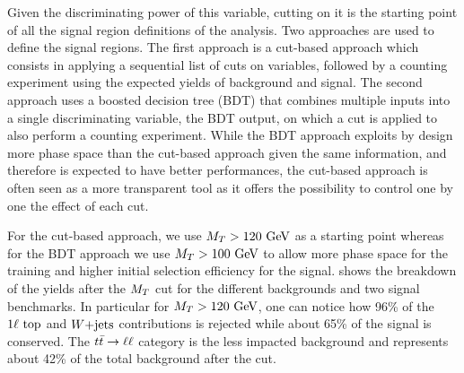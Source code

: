     Given the discriminating power of this variable, cutting on it is the starting point
    of all the signal region definitions of the analysis. Two approaches are used to define
    the signal regions. The first approach is a cut-based approach which consists in applying
    a sequential list of cuts on variables, followed by a counting experiment using the
    expected yields of background and signal. The second approach uses a boosted decision
    tree (BDT) that combines multiple inputs into a single discriminating variable, the
    BDT output, on which a cut is applied to also perform a counting experiment. While the
    BDT approach exploits by design more phase space than the cut-based approach given the
    same information, and therefore is expected to have better performances, the cut-based
    approach is often seen as a more transparent tool as it offers the possibility to control
    one by one the effect of each cut.

    For the cut-based approach, we use $M_T > 120 ~\text{GeV}$ as a starting point
    whereas for the BDT approach we use $M_T > 100 ~\text{GeV}$ to allow more phase space for the
    training and higher initial selection efficiency for the signal. 
    shows the breakdown of the yields after the $M_T$ cut for the different backgrounds and two signal benchmarks.
    In particular for $M_T > 120~\text{GeV}$, one can notice how 96\% of the $1\ell~\text{top}$ and
    $\text{$W$+jets}$ contributions is rejected while about 65\% of the signal is conserved. The
    $t\bar{t} \rightarrow \ell \ell$ category is the less impacted background and represents about
    42\% of the total background after the cut.

